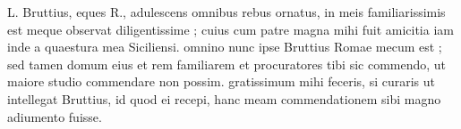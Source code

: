 


 L. Bruttius, eques R., adulescens omnibus rebus ornatus, in meis familiarissimis est meque observat diligentissime ; cuius cum patre magna mihi fuit amicitia iam inde a quaestura mea Siciliensi. omnino nunc ipse Bruttius Romae mecum est ; sed tamen domum eius et rem familiarem et procuratores tibi sic commendo, ut maiore studio commendare non possim. gratissimum mihi feceris, si curaris ut intellegat Bruttius, id quod ei recepi, hanc meam commendationem sibi magno adiumento fuisse.
